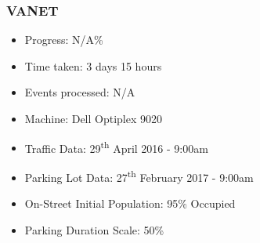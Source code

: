 \subsubsection{VANET}
\begin{itemize}
    \setlength\itemsep{0em}
    \item Progress: N/A\%
    \item Time taken:  3 days 15 hours
    \item Events processed: N/A
    \item Machine: Dell Optiplex 9020
    \item Traffic Data: 29\textsuperscript{th} April 2016 - 9:00am
    \item Parking Lot Data: 27\textsuperscript{th} February 2017 - 9:00am
    \item On-Street Initial Population: 95\% Occupied
    \item Parking Duration Scale: 50\%
\end{itemize}

